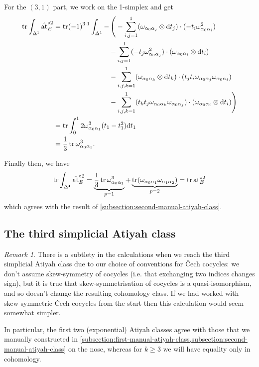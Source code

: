 \documentclass[11pt,fleqn]{article}
\theoremstyle{plain}
\theoremstyle{definition}
\theoremstyle{remark}
\newtheorem{remark}[theorem]{Remark}
\numberwithin{equation}{theorem}
\newcommand{\at}{\mathrm{at}}
\newcommand{\expat}[1]{\at^{\circ#1}}
\newcommand{\simpexpat}[1]{\hat{\at}^{\circ#1}}
\renewcommand{\d}{\mathrm{d}}
\begin{document}
        For the $(3,1)$ part, we work on the 1-simplex and get
        \begin{align*}
            \tr\int_{\Delta^1}\simpexpat{2}_E
            &= \tr(-1)^{3\cdot1}\int_{\Delta^1}-\,\Bigg(-\sum_{i,j=1}^1 (\omega_{\alpha_0\alpha_j}\otimes\d t_j)\cdot(-t_i\omega_{\alpha_0\alpha_i}^2)
        \\  &\qquad\qquad\qquad\qquad- \sum_{i,j=1}^1 (-t_j\omega_{\alpha_0\alpha_j}^2)\cdot(\omega_{\alpha_0\alpha_i}\otimes\d t_i)
        \\  &\qquad\qquad\qquad\qquad- \sum_{i,j,k=1}^1 (\omega_{\alpha_0\alpha_k}\otimes\d t_k)\cdot(t_j t_i\omega_{\alpha_0\alpha_j}\omega_{\alpha_0\alpha_i})
        \\  &\qquad\qquad\qquad\qquad- \sum_{i,j,k=1}^1 (t_k t_j\omega_{\alpha_0\alpha_k}\omega_{\alpha_0\alpha_j})\cdot(\omega_{\alpha_0\alpha_i}\otimes\d t_i)\Bigg)
        \\  &= \tr\int_0^1 2\omega_{\alpha_0\alpha_1}^3(t_1-t_1^2)\d t_1
        \\  &= \frac13\tr\omega_{\alpha_0\alpha_1}^3.
        \end{align*}

        Finally then, we have
        \begin{equation}
            \tr\int_{\Delta^\bullet}\simpexpat{2}_E = \underbrace{\frac13\tr\omega_{\alpha_0\alpha_1}^3}_{p=1} + \underbrace{\tr(\omega_{\alpha_0\alpha_1}\omega_{\alpha_1\alpha_2})}_{p=2} = \tr\expat{2}_E
        \end{equation}
        which agrees with the result of \cref{subsection:second-manual-atiyah-class}.


    \subsection{The third simplicial Atiyah class}\label{subsection:third-simplicial-atiyah-class}

        \begin{remark}
            There is a subtlety in the calculations when we reach the third simplicial Atiyah class due to our choice of conventions for Čech cocycles: we don't assume skew-symmetry of cocycles (i.e. that exchanging two indices changes sign), but it is true that skew-symmetrisation of cocycles is a quasi-isomorphism, and so doesn't change the resulting cohomology class.
            If we had worked with skew-symmetric Čech cocycles from the start then this calculation would seem somewhat simpler.

            In particular, the first two (exponential) Atiyah classes agree with those that we manually constructed in \cref{subsection:first-manual-atiyah-class,subsection:second-manual-atiyah-class} on the nose, whereas for $k\geqslant3$ we will have equality only in cohomology.
        \end{remark}
\end{document}
